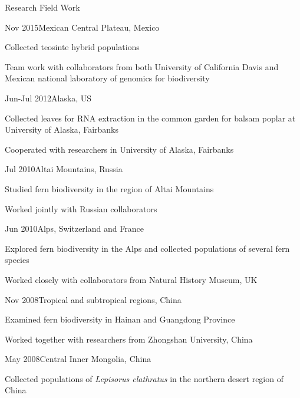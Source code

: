 \documentclass{resume} %
\begin{document}
\begin{rSection}{Research Field Work}{}{}
\begin{rSubsection}{Nov 2015}{Mexican Central Plateau, Mexico}{}{}
\item Collected teosinte hybrid populations
\item Team work with collaborators from both University of California Davis and Mexican national laboratory of genomics for biodiversity 
\end{rSubsection}

\begin{rSubsection}{Jun-Jul 2012}{Alaska, US}{}{}
\item Collected leaves for RNA extraction in the common garden for balsam poplar at University of Alaska, Fairbanks
\item Cooperated with researchers in University of Alaska, Fairbanks
\end{rSubsection}

\begin{rSubsection}{Jul 2010}{Altai Mountains, Russia}{}{}
\item Studied fern biodiversity in the region of Altai Mountains
\item Worked jointly with Russian collaborators
\end{rSubsection}

\begin{rSubsection}{Jun 2010}{Alps, Switzerland and France}{}{}
\item Explored fern biodiversity in the Alps and collected populations of several fern species
\item Worked closely with collaborators from Natural History Museum, UK
\end{rSubsection}

\begin{rSubsection}{Nov 2008}{Tropical and subtropical regions, China}{}{}
\item Examined fern biodiversity in Hainan and Guangdong Province
\item Worked together with researchers from Zhongshan University, China
\end{rSubsection}

\begin{rSubsection}{May 2008}{Central Inner Mongolia, China}{}{}
\item Collected populations of \emph{Lepisorus clathratus} in the northern desert region of China 
\end{rSubsection}


\end{rSection}
\end{document}
